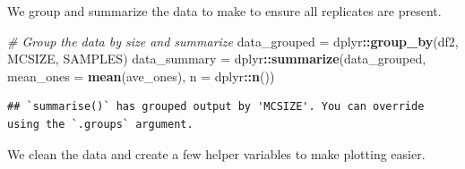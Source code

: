 \documentclass[
]{book}
\newenvironment{Shaded}{\begin{snugshade}}{\end{snugshade}}
\newcommand{\CommentTok}[1]{\textcolor[rgb]{0.56,0.35,0.01}{\textit{#1}}}
\newcommand{\DataTypeTok}[1]{\textcolor[rgb]{0.13,0.29,0.53}{#1}}
\newcommand{\KeywordTok}[1]{\textcolor[rgb]{0.13,0.29,0.53}{\textbf{#1}}}
\newcommand{\NormalTok}[1]{#1}
\newcommand{\OperatorTok}[1]{\textcolor[rgb]{0.81,0.36,0.00}{\textbf{#1}}}
\newcommand{\StringTok}[1]{\textcolor[rgb]{0.31,0.60,0.02}{#1}}
\begin{document}
We group and summarize the data to make to ensure all replicates are present.

\begin{Shaded}
\begin{Highlighting}[]
\CommentTok{\# Group the data by size and summarize}
\NormalTok{data\_grouped =}\StringTok{ }\NormalTok{dplyr}\OperatorTok{::}\KeywordTok{group\_by}\NormalTok{(df2, MCSIZE, SAMPLES)}
\NormalTok{data\_summary =}\StringTok{ }\NormalTok{dplyr}\OperatorTok{::}\KeywordTok{summarize}\NormalTok{(data\_grouped, }\DataTypeTok{mean\_ones =} \KeywordTok{mean}\NormalTok{(ave\_ones), }\DataTypeTok{n =}\NormalTok{ dplyr}\OperatorTok{::}\KeywordTok{n}\NormalTok{())}
\end{Highlighting}
\end{Shaded}

\begin{verbatim}
## `summarise()` has grouped output by 'MCSIZE'. You can override using the `.groups` argument.
\end{verbatim}

We clean the data and create a few helper variables to make plotting easier.
\end{document}
